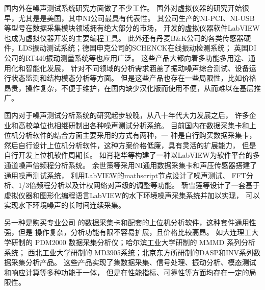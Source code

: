 国内外在噪声测试系统研究方面做了不少工作。
国外对虚拟仪器的研究开始很早，尤其是是美国，其中NI公司最具有代表性。
其公司生产的NI-PCI、NI-USB等型号在数据采集模块领域拥有绝大部分的市场，
开发的虚拟仪器软件LabVIEW也成为虚拟仪器开发的主要编程工具\cite{bitter2017}。
此外还有丹麦B\&K公司的各类传感器硬件，LDS振动测试系统；德国申克公司的SCHENCK在线振动检测系统；
英国DI公司的RT440振动测量系统等也应用广泛\cite{dingJi2014}。
这些产品大都向着多功能多用途、通用化和智能化发展，
针对不同领域的分析需求涵盖了振动噪声综合测试、设备运行状态监测和结构模态分析等方面。
但是这些产品也存在一些局限性，比如价格昂贵，操作复杂，不便于维护，在国内缺少汉化版而使用不便，从而难以在基层推广\cite{boMeasurementSystemWind2011}。

国内对于噪声测试分析系统的研究起步较晚，从八十年代大力发展之后，
许多企业和高校单位也相继研制出各种噪声测试分析系统\cite{jiangJi2020,sun2020}。
目前国内在数据采集卡和上位机分析软件的结合方面主要采用的方式有两种，一
种是自行购买数据采集卡，然后自行设计上位机分析软件，这种方案价格低廉，具有灵活的扩展能力，
但是自行开发上位机软件周期长。
如肖艳华等\cite{xiaoJiYu2017}构建了一种以LabVIEW为软件平台的多通道噪声倍频程分析系统。
余世策等\cite{yushice2016}采用NI通用数据采集卡和声压传感器搭建了通用噪声测试系统，
利用LabVIEW的mathscript节点设计了噪声测试、 FFT分析、1/3倍频程分析以及计权网络对声级的调整等功能。
靳雪莲等\cite{jinxuelian2010}设计了一套基于虚拟仪器和图形化编程语言LabVIEW的水下环境噪声采集系统并加以实现，
可以实现水下环境噪声的长时间连续采集。

另一种是购买专业公司
的数据采集卡和配套的上位机分析软件，这种套件通用性强，但是
操作复杂，分析功能有限不容易扩展，且价格比较高昂。
如大连理工大学研制的 PDM2000 数据采集分析仪；哈尔滨工业大学研制的 MMMD 系列分析系统；
西北工业大学研制的 MD3905系统；北京东方所研制的DASP和INV系列数据采集分析产品\cite{dingJi2014}。
这些产品实现了集数据采集、信号处理、振动分析、模态测试和响应计算等多种功能于一体，
但是在性能指标、可靠性等方面均存在一定的局限性。

